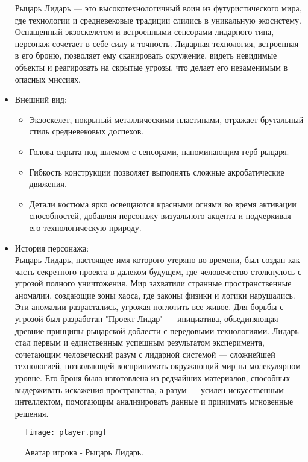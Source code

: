 \documentclass[a4paper,12pt]{article}
\begin{document}
\begin{itemize}
        Рыцарь Лидарь — это высокотехнологичный воин из футуристического мира, где технологии и средневековые традиции слились в уникальную экосистему. Оснащенный экзоскелетом и встроенными сенсорами лидарного типа, персонаж сочетает в себе силу и точность. Лидарная технология, встроенная в его броню, позволяет ему сканировать окружение, видеть невидимые объекты и реагировать на скрытые угрозы, что делает его незаменимым в опасных миссиях.
    \item Внешний вид:
        \begin{itemize}
            \item Экзоскелет, покрытый металлическими пластинами, отражает брутальный стиль средневековых доспехов.
            \item Голова скрыта под шлемом с сенсорами, напоминающим герб рыцаря.
            \item Гибкость конструкции позволяет выполнять сложные акробатические движения.
            \item Детали костюма ярко освещаются красными огнями во время активации способностей, добавляя персонажу визуального акцента и подчеркивая его технологическую природу.
        \end{itemize}
    \item История персонажа:\\
        Рыцарь Лидарь, настоящее имя которого утеряно во времени, был создан как часть секретного проекта в далеком будущем, где человечество столкнулось с угрозой полного уничтожения. Мир захватили странные пространственные аномалии, создающие зоны хаоса, где законы физики и логики нарушались. Эти аномалии разрастались, угрожая поглотить все живое.
        Для борьбы с угрозой был разработан "Проект Лидар" — инициатива, объединяющая древние принципы рыцарской доблести с передовыми технологиями. Лидарь стал первым и единственным успешным результатом эксперимента, сочетающим человеческий разум с лидарной системой — сложнейшей технологией, позволяющей воспринимать окружающий мир на молекулярном уровне. Его броня была изготовлена из редчайших материалов, способных выдерживать искажения пространства, а разум — усилен искусственным интеллектом, помогающим анализировать данные и принимать мгновенные решения.
    
\end{itemize}

\begin{figure}[H] 
    \centering
    \texttt{[image: player.png]} 
    \caption{Аватар игрока - Рыцарь Лидарь.}
    \label{fig:player_character}
\end{figure}
\end{document}
